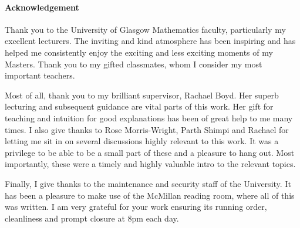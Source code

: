 \documentclass[class=article, crop=false]{standalone}
\begin{document}
\paragraph{Acknowledgement}
Thank you to the University of Glasgow Mathematics faculty, particularly my excellent lecturers. The inviting and kind atmosphere has been inspiring and has helped me consistently enjoy the exciting and less exciting moments of my Masters. Thank you to my gifted classmates, whom I consider my most important teachers.

Most of all, thank you to my brilliant supervisor, Rachael Boyd. Her superb lecturing and subsequent guidance are vital parts of this work. Her gift for teaching and intuition for good explanations has been of great help to me many times. I also give thanks to Rose Morris-Wright, Parth Shimpi and Rachael for letting me sit in on several discussions highly relevant to this work. It was a privilege to be able to be a small part of these and a pleasure to hang out. Most importantly, these were a timely and highly valuable intro to the relevant topics.

Finally, I give thanks to the maintenance and security staff of the University. It has been a pleasure to make use of the McMillan reading room, where all of this was written. I am very grateful for your work ensuring its running order, cleanliness and prompt closure at 8pm each day.
\end{document}
